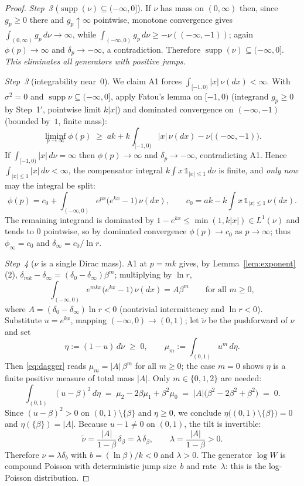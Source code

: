 \documentclass[pdflatex,sn-mathphys-num]{sn-jnl}
\theoremstyle{thmstyleone}
\theoremstyle{thmstyletwo}
\theoremstyle{thmstylethree}
\DeclareMathOperator{\supp}{supp}
\begin{document}
\begin{proof}
\textit{Step~3} ($\supp(\nu) \subseteq (-\infty,0]$).  If $\nu$ has
mass on $(0,\infty)$ then, since $g_p \ge 0$ there and $g_p \uparrow
\infty$ pointwise, monotone convergence gives $\int_{(0,\infty)}
g_p\,d\nu \to \infty$, while $\int_{(-\infty,0)} g_p\,d\nu \ge
-\nu((-\infty,-1))$; again $\phi(p) \to \infty$ and $\delta_p \to
-\infty$, a contradiction.  Therefore $\supp(\nu) \subseteq
(-\infty,0]$.  \textit{This eliminates all generators with positive
jumps.}

\textit{Step~3\textonehalf} (integrability near~$0$).  We claim A1
forces $\int_{[-1,0)} |x|\,\nu(dx) < \infty$.  With $\sigma^2 = 0$
and $\supp\nu \subseteq (-\infty,0]$, apply Fatou's lemma on
$[-1,0)$ (integrand $g_p \ge 0$ by Step~1$'$, pointwise limit
$k|x|$) and dominated convergence on $(-\infty,-1)$ (bounded by~$1$,
finite mass):
\[
  \liminf_{p\to\infty} \phi(p)
  \;\ge\; ak + k\int_{[-1,0)} |x|\,\nu(dx)
  - \nu\bigl((-\infty,-1)\bigr).
\]
If $\int_{[-1,0)}|x|\,d\nu = \infty$ then $\phi(p) \to \infty$ and
$\delta_p \to -\infty$, contradicting A1.  Hence
$\int_{|x|\le1}|x|\,d\nu < \infty$, the compensator integral
$k\int x\,\mathds{1}_{|x|\le1}\,d\nu$ is finite, and \emph{only now}
may the integral be split:
\[
  \phi(p) = c_0 + \int_{(-\infty,0)} e^{px}\bigl(e^{kx}-1\bigr)
  \,\nu(dx),
  \qquad
  c_0 = ak - k\!\int x\,\mathds{1}_{|x|\leq 1}\,\nu(dx).
\]
The remaining integrand is dominated by $1 - e^{kx} \le
\min(1, k|x|) \in L^1(\nu)$ and tends to $0$ pointwise, so by
dominated convergence $\phi(p) \to c_0$ as $p \to \infty$; thus
$\phi_\infty = c_0$ and $\delta_\infty = c_0/\ln r$.

\textit{Step~4} ($\nu$ is a single Dirac mass).  A1 at $p = mk$
gives, by Lemma~\ref{lem:exponent}(2),
$\delta_{mk} - \delta_\infty = (\delta_0-\delta_\infty)\beta^m$;
multiplying by $\ln r$,
\begin{equation}\label{eq:dagger}
  \int_{(-\infty,0)} e^{mkx}\bigl(e^{kx}-1\bigr)\,\nu(dx)
  = A\beta^m
  \qquad\text{for all } m \geq 0,
\end{equation}
where $A = (\delta_0 - \delta_\infty)\ln r < 0$ (nontrivial
intermittency and $\ln r < 0$).  Substitute $u = e^{kx}$, mapping
$(-\infty,0) \to (0,1)$; let $\tilde\nu$ be the pushforward of $\nu$
and set
\[
  \eta := (1-u)\,d\tilde\nu \;\ge\; 0,
  \qquad
  \mu_m := \int_{(0,1)} u^m \, d\eta .
\]
Then \eqref{eq:dagger} reads $\mu_m = |A|\,\beta^m$ for all $m \ge
0$; the case $m=0$ shows $\eta$ is a finite positive measure of
total mass $|A|$.  Only $m \in \{0,1,2\}$ are needed:
\[
  \int_{(0,1)} (u-\beta)^2 \, d\eta
  \;=\; \mu_2 - 2\beta\mu_1 + \beta^2\mu_0
  \;=\; |A|\bigl(\beta^2 - 2\beta^2 + \beta^2\bigr)
  \;=\; 0 .
\]
Since $(u-\beta)^2 > 0$ on $(0,1)\setminus\{\beta\}$ and $\eta \ge
0$, we conclude $\eta\bigl((0,1)\setminus\{\beta\}\bigr) = 0$ and
$\eta(\{\beta\}) = |A|$.  Because $u - 1 \neq 0$ on $(0,1)$, the
tilt is invertible:
\[
  \tilde\nu = \frac{|A|}{1-\beta}\,\delta_\beta
  = \lambda\,\delta_\beta,
  \qquad \lambda = \frac{|A|}{1-\beta} > 0 .
\]
Therefore $\nu = \lambda\delta_b$ with $b = (\ln\beta)/k < 0$ and
$\lambda > 0$.  The generator $\log W$ is compound Poisson with
deterministic jump size~$b$ and rate~$\lambda$: this is the
log-Poisson distribution.
\end{proof}
\end{document}
